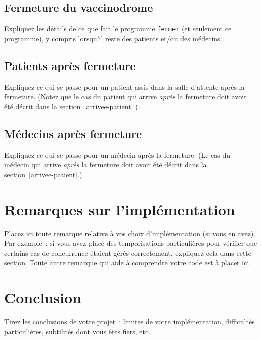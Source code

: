 \documentclass[a4paper]{article}
\makeatletter
\newenvironment{expl}{%
  \begin{list}{}{%
    \small\itshape%
    \topsep\z@%
    \listparindent0pt%
    \parsep0.75\baselineskip%
    \setlength{\leftmargin}{20mm}%
    \setlength{\rightmargin}{20mm}%
  }
    \item[]}%
    {\end{list}}
\makeatother
\begin{document}
  \subsection{Fermeture du vaccinodrome}

  \begin{expl}
    Expliquez les détails de ce que fait le programme \texttt{fermer}
    (et seulement ce programme), y compris lorsqu'il reste des patients
    et/ou des médecins.
  \end{expl}

  \subsection{Patients après fermeture}

  \begin{expl}
    Expliquez ce qui se passe pour un patient assis dans la salle
    d'attente après la fermeture. (Notez que le cas du patient qui
    arrive \emph{après} la fermeture doit avoir été décrit dans la
    section~\ref{arrivee-patient}.)
  \end{expl}

  \subsection{Médecins après fermeture}

  \begin{expl}
    Expliquez ce qui se passe pour un médecin après la fermeture. (Le
    cas du médecin qui arrive \emph{après} la fermeture doit avoir été
    décrit dans la section~\ref{arrivee-patient}.)
  \end{expl}

  \section{Remarques sur l'implémentation}

  \begin{expl}
    Placez ici toute remarque relative à vos choix d'implémentation (si
    vous en avez). Par exemple~: si vous avez placé des temporisations
    particulières pour vérifier que certains cas de concurrence étaient
    gérés correctement, expliquez cela dans cette section. Toute autre
    remarque qui aide à comprendre votre code est à placer ici.
  \end{expl}

  \section{Conclusion}

  \begin{expl}
    Tirez les conclusions de votre projet~: limites de votre
    implémentation, difficultés particulières, subtilités dont vous êtes
    fiers, etc.
  \end{expl}
\end{document}
